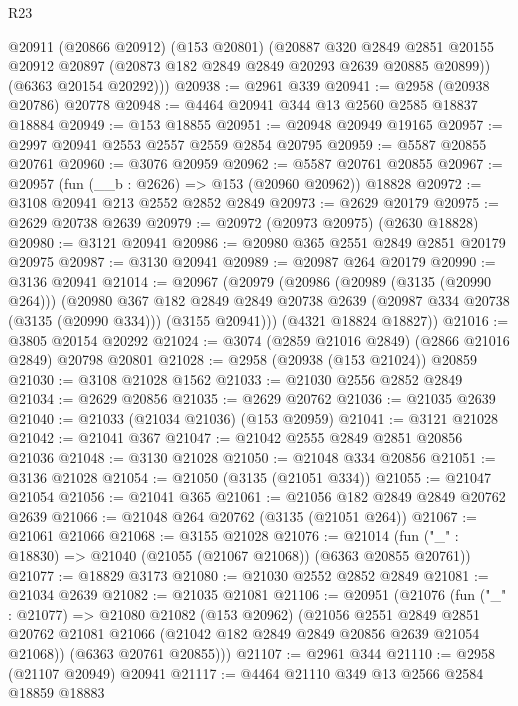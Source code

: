 \begin{lexlean}{R23}
\begin{coremodule}
      @20911
        (@20866 @20912)
        (@153 @20801)
        (@20887
          @320
          @2849
          @2851
          @20155
          @20912
          @20897
          (@20873 @182 @2849 @2849 @20293 @2639 @20885 @20899))
        (@6363 @20154 @20292)))
@20938 := @2961 @339
@20941 := @2958 (@20938 @20786) @20778
@20948 := @4464 @20941 @344 @13 @2560 @2585 @18837 @18884
@20949 := @153 @18855
@20951 := @20948 @20949 @19165
@20957 := @2997 @20941 @2553 @2557 @2559 @2854 @20795
@20959 := @5587 @20855 @20761
@20960 := @3076 @20959
@20962 := @5587 @20761 @20855
@20967 := @20957 (fun (__b : @2626) => @153 (@20960 @20962)) @18828
@20972 := @3108 @20941 @213 @2552 @2852 @2849
@20973 := @2629 @20179
@20975 := @2629 @20738 @2639
@20979 := @20972 (@20973 @20975) (@2630 @18828)
@20980 := @3121 @20941
@20986 := @20980 @365 @2551 @2849 @2851 @20179 @20975
@20987 := @3130 @20941
@20989 := @20987 @264 @20179
@20990 := @3136 @20941
@21014 := @20967
    (@20979
      (@20986
        (@20989 (@3135 (@20990 @264)))
        (@20980
          @367
          @182
          @2849
          @2849
          @20738
          @2639
          (@20987 @334 @20738 (@3135 (@20990 @334)))
          (@3155 @20941)))
      (@4321 @18824 @18827))
@21016 := @3805 @20154 @20292
@21024 := @3074 (@2859 @21016 @2849) (@2866 @21016 @2849) @20798 @20801
@21028 := @2958 (@20938 (@153 @21024)) @20859
@21030 := @3108 @21028 @1562
@21033 := @21030 @2556 @2852 @2849
@21034 := @2629 @20856
@21035 := @2629 @20762
@21036 := @21035 @2639
@21040 := @21033 (@21034 @21036) (@153 @20959)
@21041 := @3121 @21028
@21042 := @21041 @367
@21047 := @21042 @2555 @2849 @2851 @20856 @21036
@21048 := @3130 @21028
@21050 := @21048 @334 @20856
@21051 := @3136 @21028
@21054 := @21050 (@3135 (@21051 @334))
@21055 := @21047 @21054
@21056 := @21041 @365
@21061 := @21056 @182 @2849 @2849 @20762 @2639
@21066 := @21048 @264 @20762 (@3135 (@21051 @264))
@21067 := @21061 @21066
@21068 := @3155 @21028
@21076 := @21014 (fun ("_" : @18830) => @21040 (@21055 (@21067 @21068)) (@6363 @20855 @20761))
@21077 := @18829 @3173
@21080 := @21030 @2552 @2852 @2849
@21081 := @21034 @2639
@21082 := @21035 @21081
@21106 := @20951
    (@21076
      (fun ("_" : @21077) =>
      @21080
        @21082
        (@153 @20962)
        (@21056
          @2551
          @2849
          @2851
          @20762
          @21081
          @21066
          (@21042 @182 @2849 @2849 @20856 @2639 @21054 @21068))
        (@6363 @20761 @20855)))
@21107 := @2961 @344
@21110 := @2958 (@21107 @20949) @20941
@21117 := @4464 @21110 @349 @13 @2566 @2584 @18859 @18883

\end{coremodule}
\end{lexlean}
